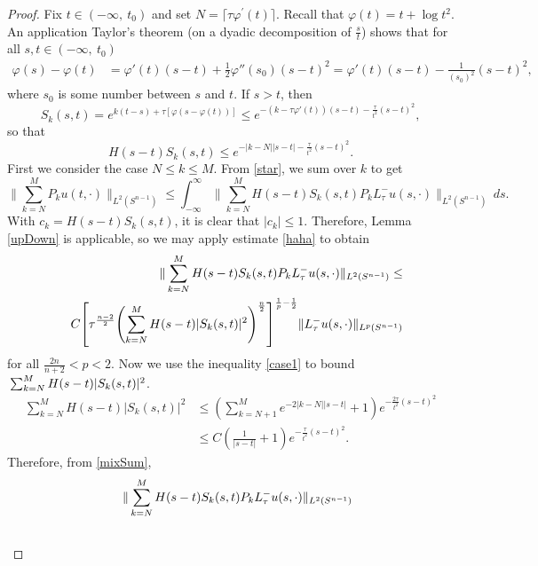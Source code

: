 \documentclass[11pt]{amsart}
\theoremstyle{plain}
\numberwithin{equation}{section}
\begin{document}
\begin{proof}
Fix $t\in (-\infty, \ t_0)$ and set $N=\lceil\tau \varphi^\prime(t)\rceil$.
Recall that $\varphi(t)=t+\log t^2$.
An application Taylor's theorem (on a dyadic decomposition of $\frac s t$) shows that for all $s, t \in (-\infty, \ t_0)$
\begin{align}
\varphi(s)-\varphi(t)
&= \varphi'(t)(s-t)+\frac{1}{2}\varphi''(s_0)(s-t)^2
= \varphi'(t)(s-t)-\frac{1}{(s_0)^2}(s-t)^2,
\label{Taylor}
\end{align}
where $s_0$ is some number between $s$ and $t$.
If $s>t$, then
$$S_k(s, t) = e^{k(t-s) + \tau{\left[{{\varphi}{\left( {s - {\varphi}{\left( {t} \right) }} \right) }}\right]}} \leq e^{-(k-\tau\varphi'(t))(s-t)-\frac{\tau}{t^2}(s-t)^2},$$
so that
\begin{equation}
H(s-t) S_k(s, t)\leq e^{-|k- N 
||s-t|-\frac{\tau}{t^2}(s-t)^2}.
\label{case1}
\end{equation}
First we consider the case $N\leq k\leq M$.
From \eqref{star}, we sum over $k$ to get
\begin{equation}
\| \sum^M_{k=N} P_k u(t, \cdot)\|_{L^2(S^{n-1})}
\leq \int_{-\infty}^{\infty} \| \sum^M_{k=N} H(s-t)S_k(s,t) P_k L^-_\tau u(s, \cdot) \|_{L^2(S^{n-1})}\, ds.
\label{back}
\end{equation}
With $c_k= H(s-t)S_k(s,t)$, it is clear that $|c_k|\leq 1$.
Therefore, Lemma \ref{upDown} is applicable, so we may apply estimate \eqref{haha} to obtain
\begin{eqnarray}
&&\|\sum^M_{k=N}H(s-t)S_k(s,t) P_k L^-_\tau u(s, \cdot)\|_{L^2(S^{n-1})}\leq \nonumber \medskip\\
&& C {\left[{ \tau^{\frac{n-2}{{2}}}{\left( {\sum^M_{k=N}
H(s-t)|S_k(s,t)|^2} \right) }^{\frac{n}{2}}}\right]}^{\frac{1}{p}-\frac{1}{2}}
 \|L^-_\tau u(s, \cdot) \|_{L^p(S^{n-1})}
\label{mixSum}
\end{eqnarray}
for all $\frac{2n}{n+2}< p < 2$. Now we use the inequality
\eqref{case1} to bound ${\displaystyle} \sum^M_{k=N} H(s-t)|S_k(s,t)|^2$.
\begin{align}
\sum^M_{k=N} H(s-t)|S_k(s,t)|^2
&\leq {\left( {\sum^M_{k=N+1} e^{-2|k- N ||s-t|}+1} \right) }e^{ -\frac{2\tau}{t^2}(s-t)^2}
\nonumber \\
&\leq  C {\left( { \frac{1}{|s-t|}+1} \right) } e^{ -\frac{\tau}{t^2}(s-t)^2} .
\label{sumBnd}
\end{align}
Therefore, from \eqref{mixSum},
\begin{eqnarray*}
&&\|\sum^M_{k=N}H(s-t)S_k(s,t) P_k L^-_\tau u(s,
\cdot)\|_{L^2(S^{n-1})} \nonumber \medskip\\ &&

\end{eqnarray*}
\end{proof}
\end{document}
